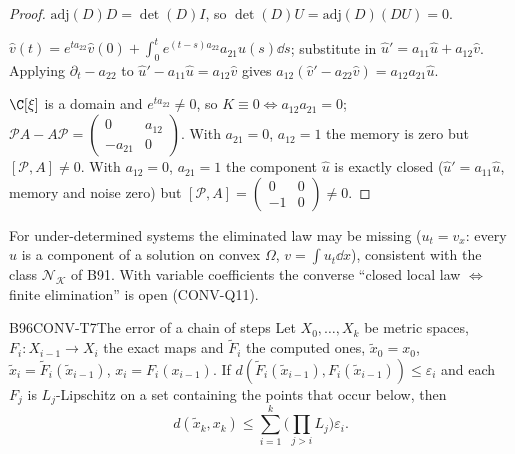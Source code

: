 \begin{proof}
$\mathrm{adj}(D)D=\det(D)I$, so $\det(D)U=\mathrm{adj}(D)(DU)=0$.

$\hat v(t)=e^{ta_{22}}\hat v(0)+\int_0^te^{(t-s)a_{22}}a_{21}\hat u(s)\dd s$; substitute in $\hat u'=a_{11}\hat u+a_{12}\hat v$. Applying $\partial_t-a_{22}$ to $\hat u'-a_{11}\hat u=a_{12}\hat v$ gives $a_{12}(\hat v'-a_{22}\hat v)=a_{12}a_{21}\hat u$.

$\C[\xi]$ is a domain and $e^{ta_{22}}\ne0$, so $K\equiv0\iff a_{12}a_{21}=0$; $\mathcal PA-A\mathcal P=\begin{pmatrix}0&a_{12}\\-a_{21}&0\end{pmatrix}$. With $a_{21}=0$, $a_{12}=1$ the memory is zero but $[\mathcal P,A]\ne0$. With $a_{12}=0$, $a_{21}=1$ the component $\hat u$ is exactly closed ($\hat u'=a_{11}\hat u$, memory and noise zero) but $[\mathcal P,A]=\begin{pmatrix}0&0\\-1&0\end{pmatrix}\ne0$.

\end{proof}

\begin{caution}[title=Reading]
For under-determined systems the eliminated law may be missing ($u_t=v_x$: every $u$ is a component of a solution on convex $\Omega$, $v=\int u_t\dd x$), consistent with the class $\mathcal N_{\mathcal K}$ of B91. With variable coefficients the converse ``closed local law $\iff$ finite elimination'' is open (CONV-Q11).
\end{caution}

\begin{dimcard}{B96}{CONV-T7}{The error of a chain of steps}{\proved}{}
Let $X_0,\dots,X_k$ be metric spaces, $F_i:X_{i-1}\to X_i$ the exact maps and $\tilde F_i$ the computed ones, $\tilde x_0=x_0$, $\tilde x_i=\tilde F_i(\tilde x_{i-1})$, $x_i=F_i(x_{i-1})$. If $d(\tilde F_i(\tilde x_{i-1}),F_i(\tilde x_{i-1}))\le\varepsilon_i$ and each $F_j$ is $L_j$-Lipschitz on a set containing the points that occur below, then
\[
d(\tilde x_k,x_k)\le\sum_{i=1}^k\Big(\prod_{j>i}L_j\Big)\varepsilon_i .
\]
\end{dimcard}

